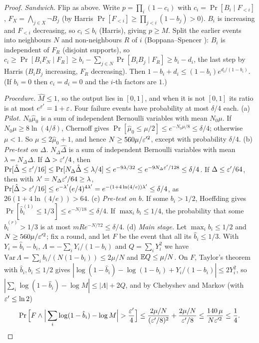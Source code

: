\begin{proof}
\emph{Sandwich.} Flip as above. Write $p=\prod_i(1-c_i)$ with
$c_i=\Pr[B_i\mid F_{<i}]$, $F_X=\bigwedge_{j\in X}\neg B_j$ (by Harris
$\Pr[F_{<i}]\ge\prod_{j<i}(1-b_j)>0$). $B_i$ is increasing and $F_{<i}$ decreasing, so
$c_i\le b_i$ (Harris), giving $p\ge M$. Split the earlier events into neighbours $N$
and non-neighbours $R$ of $i$ (Boppana--Spencer \cite{boppanaspencer1989}): $B_i$ is
independent of $F_R$ (disjoint supports), so $c_i\ge\Pr[B_iF_N\mid F_R]\ge
b_i-\sum_{j\in N}\Pr[B_iB_j\mid F_R]\ge b_i-d_i$, the last step by Harris
($B_iB_j$ increasing, $F_R$ decreasing). Then $1-b_i+d_i\le(1-b_i)e^{d_i/(1-b_i)}$.
(If $b_i=0$ then $c_i=d_i=0$ and the $i$-th factors are $1$.)

\emph{Procedure.} $\hat M\le1$, so the output lies in $[0,1]$, and when it is not
$[0,1]$ its ratio is at most $e^{\varepsilon'}=1+\varepsilon$. Four failure events have probability
at most $\delta/4$ each.
(a) \emph{Pilot.} $N_0\hat\mu_0$ is a sum of independent Bernoulli variables with mean
$N_0\mu$. If $N_0\mu\ge8\ln(4/\delta)$, Chernoff gives
$\Pr[\hat\mu_0\le\mu/2]\le e^{-N_0\mu/8}\le\delta/4$; otherwise $\mu<1$. So
$\mu\le2\hat\mu_0+1$, and hence $N\ge560\mu/\varepsilon'^2$, except with probability $\delta/4$.
(b) \emph{Pre-test on $\Delta$.} $N_\Delta\hat\Delta$ is a sum of independent Bernoulli
variables with mean $\lambda=N_\Delta\Delta$. If $\Delta>\varepsilon'/4$, then
$\Pr[\hat\Delta\le\varepsilon'/16]\le\Pr[N_\Delta\hat\Delta\le\lambda/4]\le e^{-9\lambda/32}\le
e^{-9N_\Delta\varepsilon'/128}\le\delta/4$. If $\Delta\le\varepsilon'/64$, then with
$\lambda'=N_\Delta\varepsilon'/64\ge\lambda$, $\Pr[\hat\Delta>\varepsilon'/16]\le
e^{-\lambda'}(e/4)^{4\lambda'}=e^{-(1+4\ln(4/e))\lambda'}\le\delta/4$, as
$26(1+4\ln(4/e))>64$.
(c) \emph{Pre-test on $b$.} If some $b_i>1/2$, Hoeffding gives
$\Pr[\hat b_i^{(1)}\le1/3]\le e^{-N/18}\le\delta/4$. If $\max_ib_i\le1/4$, the
probability that some $\hat b_i^{(r)}>1/3$ is at most $mRe^{-N/72}\le\delta/4$.
(d) \emph{Main stage.} Let $\max_ib_i\le1/2$ and $N\ge560\mu/\varepsilon'^2$; fix a round, and
let $F$ be the event that all its $\hat b_i\le1/3$. With $Y_i=\hat b_i-b_i$,
$\Lambda=-\sum_iY_i/(1-b_i)$ and $Q=\sum_iY_i^2$ we have
$\mathrm{Var}\,\Lambda=\sum_ib_i/(N(1-b_i))\le2\mu/N$ and $\mathbb{E} Q\le\mu/N$. On $F$, Taylor's
theorem with $\hat b_i,b_i\le1/2$ gives $|\log(1-\hat b_i)-\log(1-b_i)+Y_i/(1-b_i)|\le2Y_i^2$,
so $|\sum_i\log(1-\hat b_i)-\log M|\le|\Lambda|+2Q$, and by Chebyshev and Markov (with
$\varepsilon'\le\ln2$)
\[
\Pr\Big[F\wedge\Big|\sum_i\log(1-\hat b_i)-\log M\Big|>\frac{\eps'}4\Big]\le
\frac{2\mu/N}{(\eps'/8)^2}+\frac{2\mu/N}{\eps'/8}\le\frac{140\,\mu}{N\eps'^2}\le\frac14.
\]
\end{proof}
